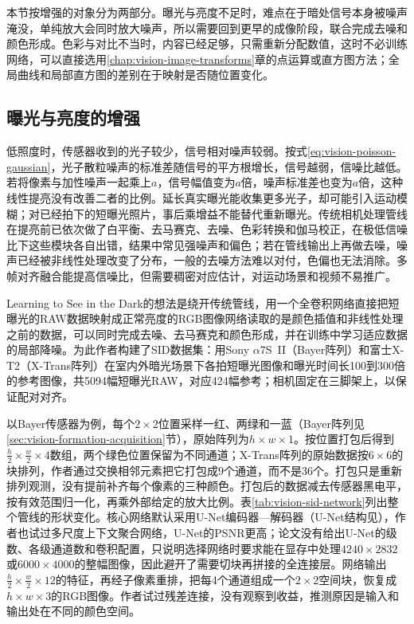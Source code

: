 本节按增强的对象分为两部分。曝光与亮度不足时，难点在于暗处信号本身被噪声淹没，单纯放大会同时放大噪声，所以需要回到更早的成像阶段，联合完成去噪和颜色形成。色彩与对比不当时，内容已经足够，只需重新分配数值，这时不必训练网络，可以直接选用\ref{chap:vision-image-transforms}章的点运算或直方图方法；全局曲线和局部直方图的差别在于映射是否随位置变化。

\subsection{曝光与亮度的增强}
\label{sec:vision-restoration-low-light}
\label{sec:vision-restoration-sid}

低照度时，传感器收到的光子较少，信号相对噪声较弱。按式\eqref{eq:vision-poisson-gaussian}，光子散粒噪声的标准差随信号的平方根增长，信号越弱，信噪比越低。若将像素与加性噪声一起乘上$a$，信号幅值变为$a$倍，噪声标准差也变为$a$倍，这种线性提亮没有改善二者的比例。延长真实曝光能收集更多光子，却可能引入运动模糊；对已经拍下的短曝光照片，事后乘增益不能替代重新曝光。传统相机处理管线在提亮前已依次做了白平衡、去马赛克、去噪、色彩转换和伽马校正，在极低信噪比下这些模块各自出错，结果中常见强噪声和偏色；若在管线输出上再做去噪，噪声已经被非线性处理改变了分布，一般的去噪方法难以对付，色偏也无法消除。多帧对齐融合能提高信噪比，但需要稠密对应估计，对运动场景和视频不易推广。

Learning to See in the Dark的想法是绕开传统管线，用一个全卷积网络直接把短曝光的RAW数据映射成正常亮度的RGB图像网络读取的是颜色插值和非线性处理之前的数据，可以同时完成去噪、去马赛克和颜色形成，并在训练中学习适应数据的局部降噪。为此作者构建了SID数据集：用Sony $\alpha$7S~II（Bayer阵列）和富士X-T2（X-Trans阵列）在室内外暗光场景下各拍短曝光图像和曝光时间长100到300倍的参考图像，共5094幅短曝光RAW，对应424幅参考；相机固定在三脚架上，以保证配对对齐。

以Bayer传感器为例，每个$2\times2$位置采样一红、两绿和一蓝（Bayer阵列见\ref{sec:vision-formation-acquisition}节），原始阵列为$h\times w\times1$。按位置打包后得到$\frac{h}{2}\times\frac{w}{2}\times4$数组，两个绿色位置保留为不同通道；X-Trans阵列的原始数据按$6\times6$的块排列，作者通过交换相邻元素把它打包成9个通道，而不是36个。打包只是重新排列观测，没有提前补齐每个像素的三种颜色。打包后的数据减去传感器黑电平，按有效范围归一化，再乘外部给定的放大比例。表\ref{tab:vision-sid-network}列出整个管线的形状变化。核心网络默认采用U-Net编码器—解码器（U-Net结构见），作者也试过多尺度上下文聚合网络，U-Net的PSNR更高；论文没有给出U-Net的级数、各级通道数和卷积配置，只说明选择网络时要求能在显存中处理$4240\times2832$或$6000\times4000$的整幅图像，因此避开了需要切块再拼接的全连接层。网络输出$\frac{h}{2}\times\frac{w}{2}\times12$的特征，再经子像素重排，把每4个通道组成一个$2\times2$空间块，恢复成$h\times w\times3$的RGB图像。作者试过残差连接，没有观察到收益，推测原因是输入和输出处在不同的颜色空间。

